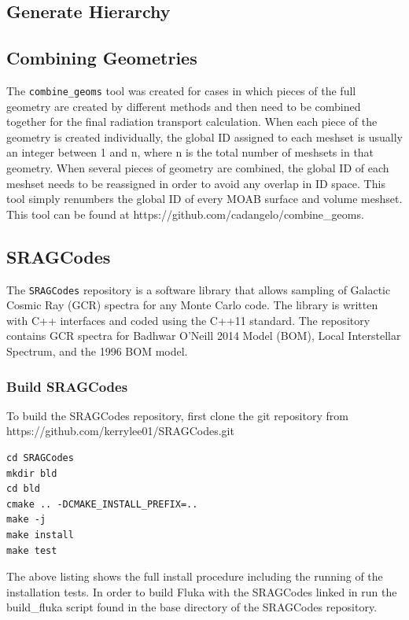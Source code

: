 \subsection{Generate Hierarchy}

\subsection{Combining Geometries}
The \texttt{combine\_geoms} tool was created for cases in which pieces of the full geometry are created
by different methods and then need to be combined together for the final radiation transport
calculation.  When each piece of the geometry is created individually, the global ID assigned
to each meshset is usually an integer between 1 and n, where n is the total number of 
meshsets in that geometry.  When several pieces of geometry are combined, the global ID of each
meshset needs to be reassigned in order to avoid any overlap in ID space.  This tool simply 
renumbers the global ID of every MOAB surface and volume meshset.  This tool can be found at
https://github.com/cadangelo/combine\_geoms.

\subsection{SRAGCodes}
The \texttt{SRAGCodes} repository is a software library that allows sampling of Galactic Cosmic Ray (GCR)
spectra for any Monte Carlo code. The library is written with C++ interfaces and coded using the C++11 
standard. The repository contains GCR spectra for Badhwar O'Neill 2014 Model (BOM), Local Interstellar Spectrum, and
the 1996 BOM model.

\subsubsection*{Build SRAGCodes}
To build the SRAGCodes repository, first clone the git repository from https://github.com/kerrylee01/SRAGCodes.git
\lstset{language=bash} 
\begin{lstlisting}
cd SRAGCodes
mkdir bld
cd bld
cmake .. -DCMAKE_INSTALL_PREFIX=..
make -j
make install
make test
\end{lstlisting}
The above listing shows the full install procedure including the running of the installation tests. In order to build
Fluka with the SRAGCodes linked in run the build\_fluka script found in the base directory of the SRAGCodes repository.
